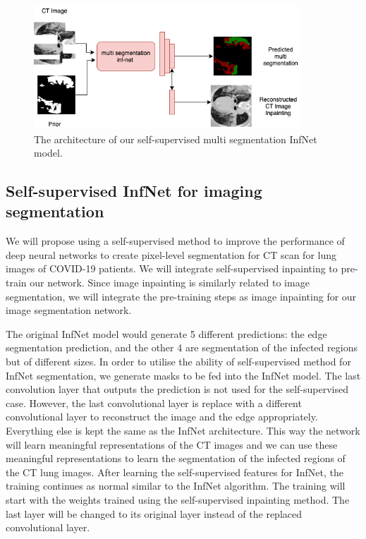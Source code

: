 \begin{figure}
	\centering
	\includegraphics[width=100mm]{self-super-multi-inf-net.png}
	\caption{The architecture of our self-supervised multi segmentation InfNet model.}
	\label{fig:multi-inf-net_arch}
\end{figure}



\subsection{Self-supervised InfNet for imaging segmentation}

We will propose using a self-supervised method to improve the performance of deep neural networks to create pixel-level segmentation for CT scan for lung images of COVID-19 patients. We will integrate self-supervised inpainting to pre-train our network. Since image inpainting is similarly related to image segmentation, we will integrate the pre-training steps as image inpainting for our image segmentation network. 

The original InfNet model would generate 5 different predictions: the edge segmentation prediction, and the other 4 are segmentation of the infected regions but of different sizes. In order to utilise the ability of self-supervised method for InfNet segmentation, we generate masks to be fed into the InfNet model. The last convolution layer that outputs the prediction is not used for the self-supervised case. However, the last convolutional layer is replace with a different convolutional layer to reconstruct the image and the edge appropriately. Everything else is kept the same as the InfNet architecture. This way the network will learn meaningful representations of the CT images and we can use these meaningful representations to learn the segmentation of the infected regions of the CT lung images. After learning the self-supervised features for InfNet, the training continues as normal similar to the InfNet algorithm. The training will start with the weights trained using the self-supervised inpainting method. The last layer will be changed to its original layer instead of the replaced convolutional layer. 

